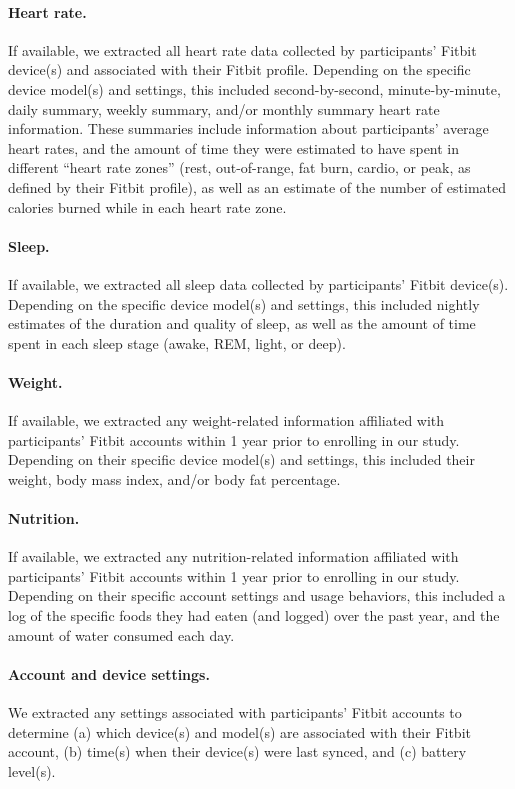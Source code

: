 \documentclass[10pt]{article}
\begin{document}
\paragraph{Heart rate.}  If available, we extracted all heart rate
data collected by participants' Fitbit device(s) and associated with
their Fitbit profile.  Depending on the specific device model(s) and
settings, this included second-by-second, minute-by-minute, daily
summary, weekly summary, and/or monthly summary heart rate
information.  These summaries include information about participants'
average heart rates, and the amount of time they were estimated to
have spent in different ``heart rate zones'' (rest, out-of-range, fat
burn, cardio, or peak, as defined by their Fitbit profile), as well as
an estimate of the number of estimated calories burned while in each
heart rate zone.

\paragraph{Sleep.}  If available, we extracted all sleep data
collected by participants' Fitbit device(s).  Depending on the
specific device model(s) and settings, this included nightly estimates
of the duration and quality of sleep, as well as the amount of time
spent in each sleep stage (awake, REM, light, or deep).

\paragraph{Weight.}  If available, we extracted any weight-related
information affiliated with participants' Fitbit accounts within 1
year prior to enrolling in our study.  Depending on their specific
device model(s) and settings, this included their weight, body mass
index, and/or body fat percentage.

\paragraph{Nutrition.} If available, we extracted any
nutrition-related information affiliated with participants' Fitbit
accounts within 1 year prior to enrolling in our study. Depending on
their specific account settings and usage behaviors, this included a
log of the specific foods they had eaten (and logged) over the past
year, and the amount of water consumed each day.

\paragraph{Account and device settings.}  We extracted any settings
associated with participants' Fitbit accounts to determine (a) which
device(s) and model(s) are associated with their Fitbit account, (b)
time(s) when their device(s) were last synced, and (c) battery
level(s).
\end{document}
